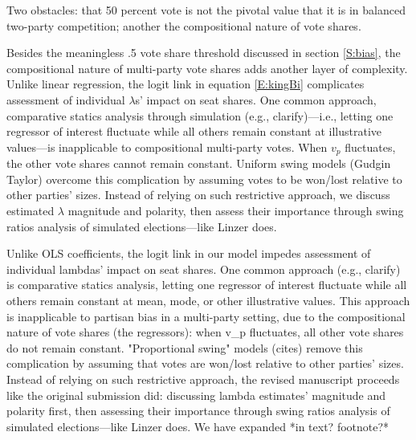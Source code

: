 Two obstacles: that 50 percent vote is not the pivotal value that it is in balanced two-party competition; another the compositional nature of vote shares. 

Besides the meaningless .5 vote share threshold discussed in section \ref{S:bias}, the compositional nature of multi-party vote shares adds another layer of complexity. Unlike linear regression, the logit link in equation \ref{E:kingBi} complicates assessment of individual $\lambda$s' impact on seat shares. One common approach, comparative statics analysis through simulation (e.g., clarify)---i.e., letting one regressor of interest fluctuate while all others remain constant at illustrative values---is inapplicable to compositional multi-party votes. When $v_p$ fluctuates, the other vote shares cannot remain constant. Uniform swing models (Gudgin Taylor) overcome this complication by assuming votes to be won/lost relative to other parties' sizes. Instead of relying on such restrictive approach, we discuss estimated $\lambda$ magnitude and polarity, then assess their importance through swing ratios analysis of simulated elections---like Linzer does.

Unlike OLS coefficients, the logit link in our model impedes assessment of individual lambdas' impact on seat shares. One common approach (e.g., clarify) is comparative statics analysis, letting one regressor of interest fluctuate while all others remain constant at mean, mode, or other illustrative values. This approach is inapplicable to partisan bias in a multi-party setting, due to the compositional nature of vote shares (the regressors): when v_p fluctuates, all other vote shares do not remain constant. "Proportional swing" models (cites) remove this complication by assuming that votes are won/lost relative to other parties' sizes. Instead of relying on such restrictive approach, the revised manuscript proceeds like the original submission did: discussing lambda estimates' magnitude and polarity first, then assessing their importance through swing ratios analysis of simulated elections---like Linzer does. We have expanded *in text? footnote?*
